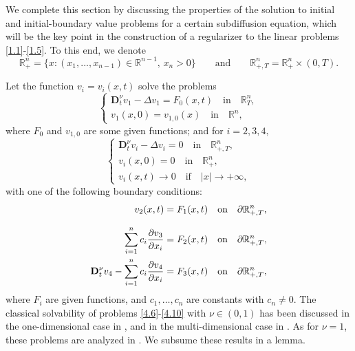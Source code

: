 \documentclass[reqno]{amsart}
\def\R {\mathbb{R}}
\theoremstyle{definition}
\numberwithin{equation}{section}
\begin{document}
We complete this section by discussing the properties of the solution to initial and initial-boundary value problems for a certain subdiffusion equation, which will be the key point in
the construction of a regularizer to the linear problems \eqref{1.1}-\eqref{1.5}. To this end, we denote
\[
\R^{n}_{+}=\{x:(x_1,...,x_{n-1})\in\R^{n-1},\, x_n>0\}\qquad
\text{and}\qquad \R_{+,T}^{n}=\R^{n}_{+}\times(0,T).
\]

Let the function $v_i=v_i(x,t)$ solve the problems
\begin{equation}\label{4.6}
\begin{cases}
\mathbf{D}_{t}^{\nu}v_1-\Delta v_1=F_{0}(x,t)\quad\text{in}\quad \R^{n}_{T},\\
v_{1}(x,0)=v_{1,0}(x)\quad\text{in}
\quad\R^{n},
\end{cases}
\end{equation}
where $F_0$ and $v_{1,0}$ are some given functions; and for $i=2,3,4,$
\begin{equation}\label{4.7}
\begin{cases}
\mathbf{D}_{t}^{\nu}v_i-\Delta v_{i}=0\quad\text{in}\quad \R_{+,T}^{n},\\
v_{i}(x,0)=0\quad\text{in}\quad\R_{+}^{n},\\
v_{i}(x,t)\to 0\quad\text{if}\quad |x|\to+\infty,
\end{cases}
\end{equation}
with one of the following boundary conditions:
\begin{align}\label{4.8}
v_{2}(x,t)&=F_{1}(x,t)\quad\text{on}\quad \partial\R_{+,T}^{n},\\
\noalign{\vskip2.5mm}
\label{4.9}
\sum_{i=1}^{n}c_{i}\frac{\partial v_3}{\partial x_i}&=F_{2}(x,t)\quad\text{on}\quad \partial\R_{+,T}^{n},\\
\label{4.10}
\mathbf{D}_{t}^{\nu}v_4-\sum_{i=1}^{n}c_{i}\frac{\partial v_4}{\partial x_i}&=F_{3}(x,t)\quad\text{on}\quad \partial\R_{+,T}^{n},
\end{align}
where $F_i$ are given functions, and $c_1,\ldots,c_n$ are constants with $c_n\neq 0$. The classical solvability of problems \eqref{4.6}-\eqref{4.10} with $\nu\in(0,1)$ has been discussed in the one-dimensional case in \cite{KV1,KV2}, and in the multi-dimensional case in \cite{K1,K2}. As for $\nu=1$, these problems are analyzed in \cite[Section 4]{LSU}.
We subsume these results in a lemma.
\end{document}

